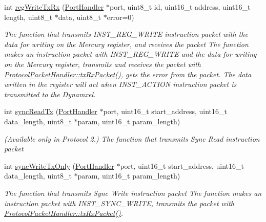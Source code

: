 \begin{DoxyCompactItemize}
int \hyperlink{classmercury_1_1_protocol_packet_handler_a314845a3e5d2030e56db2739310ad117}{reg\+Write\+Tx\+Rx} (\hyperlink{classmercury_1_1_port_handler}{Port\+Handler} $\ast$port, uint8\+\_\+t id, uint16\+\_\+t address, uint16\+\_\+t length, uint8\+\_\+t $\ast$data, uint8\+\_\+t $\ast$error=0)
\begin{DoxyCompactList}\small\item\em The function that transmits I\+N\+S\+T\+\_\+\+R\+E\+G\+\_\+\+W\+R\+I\+TE instruction packet with the data for writing on the Mercury register, and receives the packet  The function makes an instruction packet with I\+N\+S\+T\+\_\+\+R\+E\+G\+\_\+\+W\+R\+I\+TE and the data for writing on the Mercury register,  transmits and receives the packet with \hyperlink{classmercury_1_1_protocol_packet_handler_a68b02f23af616886d0795ea12debd613}{Protocol\+Packet\+Handler\+::tx\+Rx\+Packet()},  gets the error from the packet.  The data written in the register will act when I\+N\+S\+T\+\_\+\+A\+C\+T\+I\+ON instruction packet is transmitted to the Dynamxel. \end{DoxyCompactList}\item 
int \hyperlink{classmercury_1_1_protocol_packet_handler_af742b8964f4a2fed30b268a8c6434652}{sync\+Read\+Tx} (\hyperlink{classmercury_1_1_port_handler}{Port\+Handler} $\ast$port, uint16\+\_\+t start\+\_\+address, uint16\+\_\+t data\+\_\+length, uint8\+\_\+t $\ast$param, uint16\+\_\+t param\+\_\+length)
\begin{DoxyCompactList}\small\item\em (Available only in Protocol 2.) The function that transmits Sync Read instruction packet \end{DoxyCompactList}\item 
int \hyperlink{classmercury_1_1_protocol_packet_handler_a4a08a338c48d6c9ef42183ca74297dce}{sync\+Write\+Tx\+Only} (\hyperlink{classmercury_1_1_port_handler}{Port\+Handler} $\ast$port, uint16\+\_\+t start\+\_\+address, uint16\+\_\+t data\+\_\+length, uint8\+\_\+t $\ast$param, uint16\+\_\+t param\+\_\+length)
\begin{DoxyCompactList}\small\item\em The function that transmits Sync Write instruction packet  The function makes an instruction packet with I\+N\+S\+T\+\_\+\+S\+Y\+N\+C\+\_\+\+W\+R\+I\+TE,  transmits the packet with \hyperlink{classmercury_1_1_protocol_packet_handler_a68b02f23af616886d0795ea12debd613}{Protocol\+Packet\+Handler\+::tx\+Rx\+Packet()}. \end{DoxyCompactList}\item 

\end{DoxyCompactItemize}
